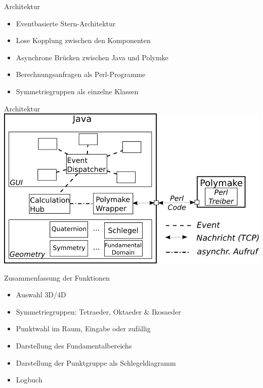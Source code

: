 \documentclass[ucs,11pt]{beamer}
\begin{document}
\begin{frame}[t]{Architektur}
\vspace{1.5cm}
	\begin{itemize}
		\item Eventbasierte Stern-Architektur \pause
		\item Lose Kopplung zwischen den Komponenten \pause
		\item Asynchrone Brücken zwischen Java und Polymke \pause
		\item Berechnungsanfragen als Perl-Programme \pause
		\item Symmetriegruppen als einzelne Klassen
	\end{itemize}
\vspace{1cm}
\end{frame}

\begin{frame}{Architektur}
\includegraphics[width=1\textwidth]{architecture.png}
\end{frame}

\begin{frame}{Zusammenfassung der Funktionen}
	\begin{itemize}
		\item Auswahl 3D/4D \pause
		\item Symmetriegruppen: Tetraeder, Oktaeder \& Ikosaeder \pause
		\item Punktwahl im Raum, Eingabe oder zufällig \pause
		\item Darstellung des Fundamentalbereichs \pause
		\item Darstellung der Punktgruppe als Schlegeldiagramm \pause
		\item Logbuch 	
	\end{itemize}
\end{frame}
\end{document}
